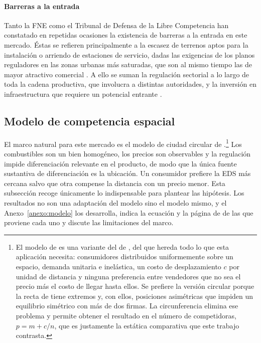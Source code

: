 \paragraph{Barreras a la entrada} Tanto la FNE como el Tribunal de Defensa de la Libre Competencia han constatado en repetidas ocasiones la existencia de barreras a la entrada en este mercado. Éstas se refieren principalmente a la escasez de terrenos aptos para la instalación o arriendo de estaciones de servicio, dadas las exigencias de los planos reguladores en las zonas urbanas más saturadas, que son al mismo tiempo las de mayor atractivo comercial \parencite{FNE2021informe}. A ello se suman la regulación sectorial a lo largo de toda la cadena productiva, que involucra a distintas autoridades, y la inversión en infraestructura que requiere un potencial entrante \parencite{FNE2025informe}.

\subsection{Modelo de competencia espacial}

El marco natural para este mercado es el modelo de ciudad circular de \textcite{SALOP1979}.\footnote{El modelo de \textcite{SALOP1979} es una variante del de \textcite{HOTELLING1929}, del que hereda todo lo que esta aplicación necesita: consumidores distribuidos uniformemente sobre un espacio, demanda unitaria e inelástica, un costo de desplazamiento $c$ por unidad de distancia y ninguna preferencia entre vendedores que no sea el precio más el costo de llegar hasta ellos. Se prefiere la versión circular porque la recta de \textcite{HOTELLING1929} tiene extremos y, con ellos, posiciones asimétricas que impiden un equilibrio simétrico con más de dos firmas. La circunferencia elimina ese problema y permite obtener el resultado en el número de competidoras, $p = m + c/n$, que es justamente la estática comparativa que este trabajo contrasta.} Los combustibles son un bien homogéneo, los precios son observables y la regulación impide diferenciación relevante en el producto, de modo que la única fuente sustantiva de diferenciación es la ubicación. Un consumidor prefiere la EDS más cercana salvo que otra compense la distancia con un precio menor. Esta subsección recoge únicamente lo indispensable para plantear las hipótesis. Los resultados no son una adaptación del modelo sino el modelo mismo, y el Anexo~\ref{anexo:modelo} los desarrolla, indica la ecuación y la página de \textcite{SALOP1979} de las que proviene cada uno y discute las limitaciones del marco.


